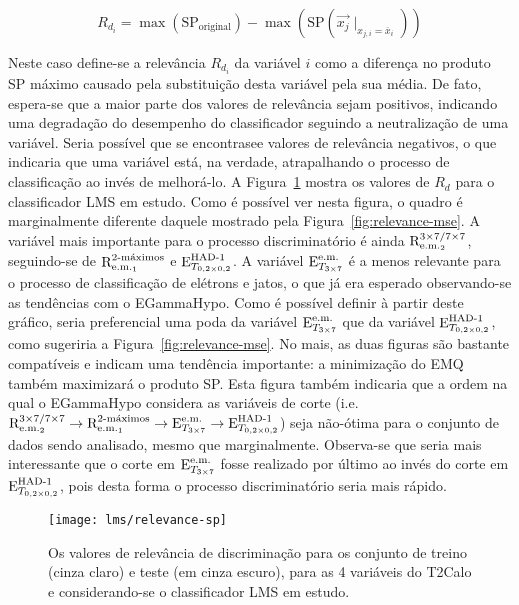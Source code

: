 \begin{equation}
R_{d_i} = \max(\text{SP}_{\text{original}}) - \max(\text{SP}(\overrightarrow{x_j}\mid_{x_{j,i} = \overline{x}_i}))
\label{eq:relevance-sp}
\end{equation}

Neste caso define-se a relevância $R_{d_i}$ da variável $i$ como a diferença
no produto SP máximo causado pela substituição desta variável pela sua
média. De fato, espera-se que a maior parte dos valores de relevância sejam
positivos, indicando uma degradação do desempenho do classificador seguindo a
neutralização de uma variável. Seria possível que se encontrasee valores de
relevância negativos, o que indicaria que uma variável está, na verdade,
atrapalhando o processo de classificação ao invés de melhorá-lo. A
Figura~\ref{fig:relevance-sp} mostra os valores de $R_d$ para o classificador
LMS em estudo. Como é possível ver nesta figura, o quadro é marginalmente
diferente daquele mostrado pela Figura~\ref{fig:relevance-mse}. A variável
mais importante para o processo discriminatório é ainda $\rcore$, seguindo-se
de $\eratio$ e $\ethad$. A variável $\etem$ é a menos relevante para o
processo de classificação de elétrons e jatos, o que já era esperado
observando-se as tendências com o EGammaHypo. Como é possível definir à partir
deste gráfico, seria preferencial uma poda da variável $\etem$ que da variável
$\ethad$, como sugeriria a Figura~\ref{fig:relevance-mse}. No mais, as duas
figuras são bastante compatíveis e indicam uma tendência importante: a
minimização do EMQ também maximizará o produto SP. Esta figura também
indicaria que a ordem na qual o EGammaHypo considera as variáveis de corte
(i.e. $\rcore \rightarrow
\eratio \rightarrow \etem \rightarrow \ethad$) seja não-ótima para o conjunto
de dados sendo analisado, mesmo que marginalmente. Observa-se que seria mais
interessante que o corte em $\etem$ fosse realizado por último ao invés do
corte em $\ethad$, pois desta forma o processo discriminatório seria mais
rápido.

\begin{figure}
\begin{center}
\texttt{[image: lms/relevance-sp]}
\end{center}
\caption{Os valores de relevância de discriminação para os conjunto de treino
(cinza claro) e teste (em cinza escuro), para as 4 variáveis do T2Calo e
considerando-se o classificador LMS em estudo.}
\label{fig:relevance-sp}
\end{figure}

